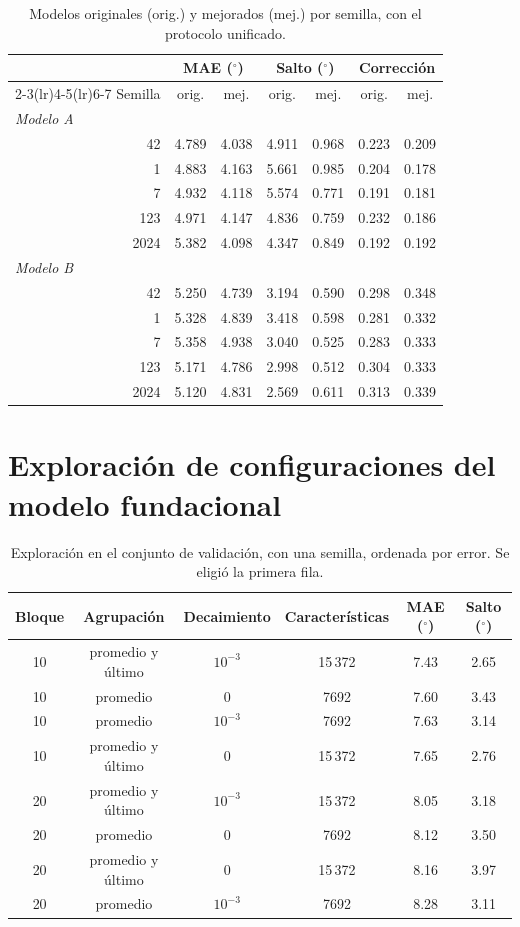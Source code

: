 \documentclass[11pt,a4paper]{amsart}
\newcommand{\gr}{$^{\circ}$}
\begin{document}
\begin{table}[h]
\centering\small
\begin{tabular}{rcccccc}
\toprule
 & \multicolumn{2}{c}{MAE (\gr)} & \multicolumn{2}{c}{Salto (\gr)} & \multicolumn{2}{c}{Corrección} \\
\cmidrule(lr){2-3}\cmidrule(lr){4-5}\cmidrule(lr){6-7}
Semilla & orig. & mej. & orig. & mej. & orig. & mej. \\
\midrule
\multicolumn{7}{l}{\textit{Modelo A}}\\
42 & 4.789 & 4.038 & 4.911 & 0.968 & 0.223 & 0.209 \\
1 & 4.883 & 4.163 & 5.661 & 0.985 & 0.204 & 0.178 \\
7 & 4.932 & 4.118 & 5.574 & 0.771 & 0.191 & 0.181 \\
123 & 4.971 & 4.147 & 4.836 & 0.759 & 0.232 & 0.186 \\
2024 & 5.382 & 4.098 & 4.347 & 0.849 & 0.192 & 0.192 \\
\midrule
\multicolumn{7}{l}{\textit{Modelo B}}\\
42 & 5.250 & 4.739 & 3.194 & 0.590 & 0.298 & 0.348 \\
1 & 5.328 & 4.839 & 3.418 & 0.598 & 0.281 & 0.332 \\
7 & 5.358 & 4.938 & 3.040 & 0.525 & 0.283 & 0.333 \\
123 & 5.171 & 4.786 & 2.998 & 0.512 & 0.304 & 0.333 \\
2024 & 5.120 & 4.831 & 2.569 & 0.611 & 0.313 & 0.339 \\
\bottomrule
\end{tabular}
\caption{Modelos originales (orig.) y mejorados (mej.) por semilla, con el protocolo unificado.}
\end{table}

\section{Exploración de configuraciones del modelo fundacional}
\label{app:timesfm}

\begin{table}[h]
\centering\small
\begin{tabular}{cccccc}
\toprule
Bloque & Agrupación & Decaimiento & Características & MAE (\gr) & Salto (\gr) \\
\midrule
10 & promedio y último & $10^{-3}$ & 15\,372 & 7.43 & 2.65 \\
10 & promedio & 0 & 7692 & 7.60 & 3.43 \\
10 & promedio & $10^{-3}$ & 7692 & 7.63 & 3.14 \\
10 & promedio y último & 0 & 15\,372 & 7.65 & 2.76 \\
20 & promedio y último & $10^{-3}$ & 15\,372 & 8.05 & 3.18 \\
20 & promedio & 0 & 7692 & 8.12 & 3.50 \\
20 & promedio y último & 0 & 15\,372 & 8.16 & 3.97 \\
20 & promedio & $10^{-3}$ & 7692 & 8.28 & 3.11 \\
\bottomrule
\end{tabular}
\caption{Exploración en el conjunto de validación, con una semilla, ordenada por error. Se eligió la primera fila.}
\end{table}
\end{document}
